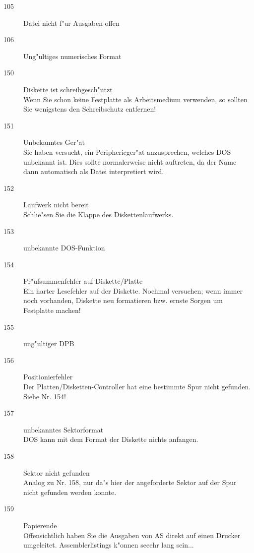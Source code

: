 \documentclass[12pt,a4paper,twoside]{report}
\begin{document}
{\begin{description}
\item[105]{Datei nicht f"ur Ausgaben offen}

\item[106]{Ung"ultiges numerisches Format}

\item[150]{Diskette ist schreibgesch"utzt\\
           Wenn Sie schon keine Festplatte als Arbeitsmedium verwenden,
           so sollten Sie wenigstens den Schreibschutz entfernen!}

\item[151]{Unbekanntes Ger"at\\
           Sie haben versucht, ein Peripherieger"at anzusprechen, welches
           DOS unbekannt ist.  Dies sollte normalerweise nicht auftreten,
           da der Name dann automatisch als Datei interpretiert wird.}

\item[152]{Laufwerk nicht bereit\\
           Schlie"sen Sie die Klappe des Diskettenlaufwerks.}

\item[153]{unbekannte DOS-Funktion}

\item[154]{Pr"ufsummenfehler auf Diskette/Platte\\
           Ein harter Lesefehler auf der Diskette.  Nochmal versuchen; wenn
           immer noch vorhanden, Diskette neu formatieren bzw. ernste Sorgen
           um Festplatte machen!}

\item[155]{ung"ultiger DPB}

\item[156]{Positionierfehler\\
           Der Platten/Disketten-Controller hat eine bestimmte Spur nicht
           gefunden.  Siehe Nr. 154!}

\item[157]{unbekanntes Sektorformat\\
           DOS kann mit dem Format der Diskette nichts anfangen.}

\item[158]{Sektor nicht gefunden\\
           Analog zu Nr. 158, nur da"s hier der angeforderte Sektor auf
           der Spur nicht gefunden werden konnte.}

\item[159]{Papierende\\
           Offensichtlich haben Sie die Ausgaben von AS direkt auf einen
           Drucker umgeleitet.  Assemblerlistings k"onnen seeehr lang
           sein...}


\end{description}}
\end{document}
